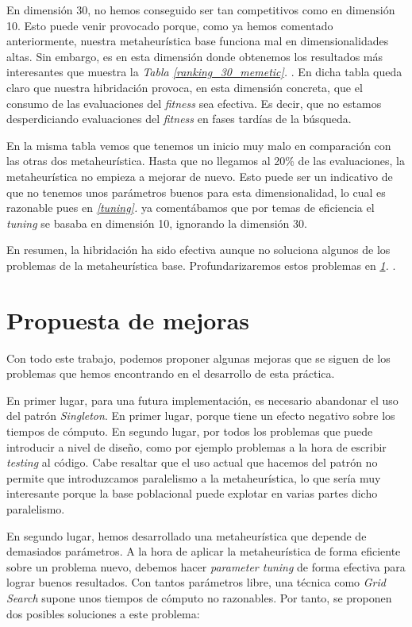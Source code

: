 \documentclass[11pt]{article}
\begin{document}
En dimensión 30, no hemos conseguido ser tan competitivos como en dimensión 10. Esto puede venir provocado porque, como ya hemos comentado anteriormente, nuestra metaheurística base funciona mal en dimensionalidades altas. Sin embargo, es en esta dimensión donde obtenemos los resultados más interesantes que muestra la \emph{Tabla \ref{ranking_30_memetic}. }. En dicha tabla queda claro que nuestra hibridación provoca, en esta dimensión concreta, que el consumo de las evaluaciones del \emph{fitness} sea efectiva. Es decir, que no estamos desperdiciando evaluaciones del \emph{fitness} en fases tardías de la búsqueda.

En la misma tabla vemos que tenemos un inicio muy malo en comparación con las otras dos metaheurística. Hasta que no llegamos al 20\% de las evaluaciones, la metaheurística no empieza a mejorar de nuevo. Esto puede ser un indicativo de que no tenemos unos parámetros buenos para esta dimensionalidad, lo cual es razonable pues en \emph{\ref{tuning}. } ya comentábamos que por temas de eficiencia el \emph{tuning} se basaba en dimensión 10, ignorando la dimensión 30.

En resumen, la hibridación ha sido efectiva aunque no soluciona algunos de los problemas de la metaheurística base. Profundarizaremos estos problemas en \emph{\ref{mejoras}. }.

\pagebreak
\section{Propuesta de mejoras} \label{mejoras}

Con todo este trabajo, podemos proponer algunas mejoras que se siguen de los problemas que hemos encontrando en el desarrollo de esta práctica.

En primer lugar, para una futura implementación, es necesario abandonar el uso del patrón \emph{Singleton}. En primer lugar, porque tiene un efecto negativo sobre los tiempos de cómputo. En segundo lugar, por todos los problemas que puede introducir a nivel de diseño, como por ejemplo problemas a la hora de escribir \emph{testing} al código. Cabe resaltar que el uso actual que hacemos del patrón no permite que introduzcamos paralelismo a la metaheurística, lo que sería muy interesante porque la base poblacional puede explotar en varias partes dicho paralelismo.

En segundo lugar, hemos desarrollado una metaheurística que depende de demasiados parámetros. A la hora de aplicar la metaheurística de forma eficiente sobre un problema nuevo, debemos hacer \emph{parameter tuning} de forma efectiva para lograr buenos resultados. Con tantos parámetros libre, una técnica como \emph{Grid Search} supone unos tiempos de cómputo no razonables. Por tanto, se proponen dos posibles soluciones a este problema:
\end{document}
